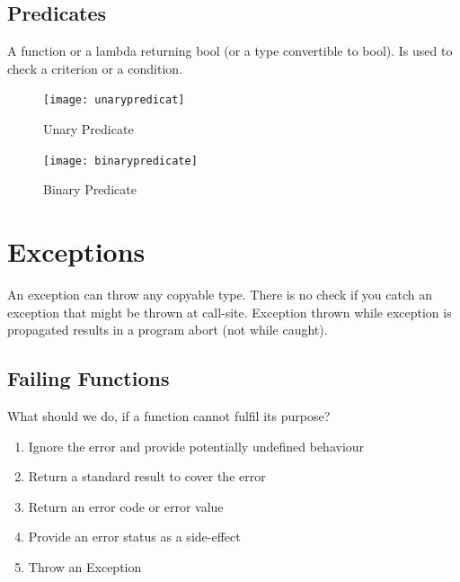 \subsection{Predicates}
A function or a lambda returning bool (or a type convertible to bool). Is used to check a criterion or a condition.

\begin{figure}[h!]
  \center
  \texttt{[image: unarypredicat]}
  \caption{Unary Predicate}
\end{figure}

\begin{figure}[h!]
  \center
  \texttt{[image: binarypredicate]}
  \caption{Binary Predicate}
\end{figure}





\pagebreak
\section{Exceptions}
An exception can throw any copyable type. There is no check if you catch an exception that might be thrown at call-site. Exception thrown while exception is propagated results in a program abort (not while caught). 

\subsection{Failing Functions}
What should we do, if a function cannot fulfil its purpose?
\begin{enumerate}
  \itemsep -0.5em 
  \item Ignore the error and provide potentially undefined behaviour
  \item Return a standard result to cover the error
  \item Return an error code or error value
  \item Provide an error status as a side-effect
  \item Throw an Exception
\end{enumerate}

